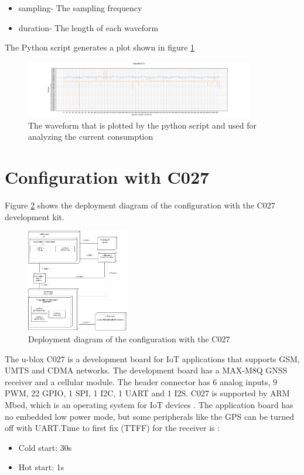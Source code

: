 \begin{itemize}
    \item sampling- The sampling frequency 
    \item duration- The length of each waveform
    
\end{itemize}
The Python script generates a plot shown in figure \ref{fig:pythonwaveform}

\begin{figure}[H]
\centering
\includegraphics[height=2.5cm]{Project_Report/Images/pythonwaveform.png}
\caption{The waveform that is plotted by the python script and used for analyzing the current consumption}
\label{fig:pythonwaveform}
\end{figure}
 

\section{Configuration with C027}
Figure \ref{fig:deploy_C027} shows the deployment diagram of the configuration with the C027 development kit.  

\begin{figure}[H]
\centering
\includegraphics[height=4.5cm]{Project_Report/Images/C027_deploy.png}
\caption{Deployment diagram of the configuration with the C027}
\label{fig:deploy_C027}
\end{figure}
\vspace{5mm}The u-blox C027 is a development board for IoT applications that supports GSM, UMTS and CDMA networks. The development board has a MAX-M8Q GNSS receiver and a cellular module. The header connector has 6 analog inputs, 9 PWM, 22 GPIO, 1 SPI, 1 I2C, 1 UART and 1 I2S. C027 is supported by ARM Mbed, which is an operating system for IoT devices \cite{C027}. The application board has no embedded low power mode, but some peripherals like the GPS can be turned off with UART.Time to first fix (TTFF) for the receiver is \cite{MAX-M8}:
\begin{itemize}
    \item Cold start: 30s
    \item Hot  start: 1s
\end{itemize}

